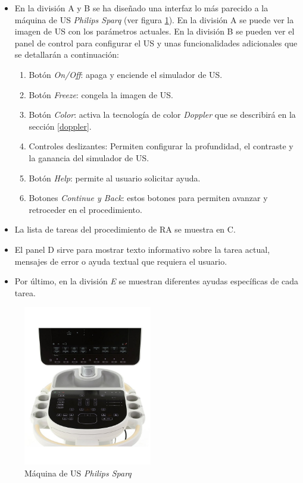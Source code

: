 \begin{itemize}
    \item En la división A y B se ha diseñado una interfaz lo más parecido a la máquina de \ac{US} \emph{Philips Sparq}\cite{Philips} (ver figura \ref{fig:philips}). En la división A se puede ver la imagen de \ac{US} con los parámetros actuales. En la división B se pueden ver el panel de control para configurar el \ac{US} y unas funcionalidades adicionales que se detallarán a continuación:
    \begin{enumerate}
        
        \item Botón \emph{On/Off}: apaga y enciende el simulador de \ac{US}.
        \item Botón \emph{Freeze}: congela la imagen de \ac{US}.
 \item Botón \emph{Color}: activa la tecnología de color \emph{Doppler} que se describirá en la sección \ref{doppler}.
\item Controles deslizantes: Permiten configurar la profundidad, el contraste y la ganancia del simulador de \ac{US}.
        \item Botón \emph{Help}: permite al usuario solicitar ayuda.
        \item Botones \emph{Continue y Back}: estos botones para permiten avanzar y retroceder en el procedimiento. 
    \end{enumerate}
    \item La lista de tareas del procedimiento de \ac{RA} se muestra en C.
    \item El panel D sirve para mostrar texto informativo sobre la tarea actual, mensajes de error o ayuda textual que requiera el usuario.
    \item Por último, en la división \emph{E} se muestran diferentes ayudas específicas de cada tarea.
\end{itemize}




\begin{figure}[h]
    \centering
    \includegraphics[width=0.5\textwidth]{IMG/philips.jpg}
    \caption{Máquina de \ac{US} \emph{Philips Sparq}\cite{Philips}}
    \label{fig:philips}
\end{figure}


